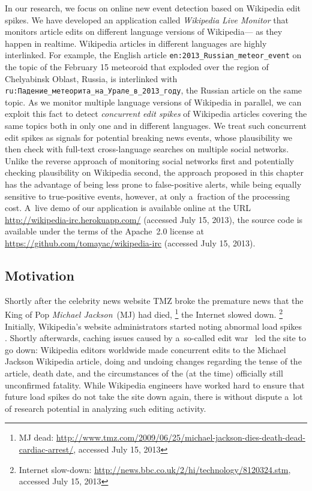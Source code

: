 In our research, we focus on online new event detection based on Wikipedia edit spikes.
We have developed an application called \emph{Wikipedia Live Monitor}
that monitors article edits on different language versions of Wikipedia---%
as they happen in realtime.
Wikipedia articles in different languages are highly interlinked.
For example, the English article \texttt{en:2013\_Russian\_meteor\_event}
on the topic of the February 15 meteoroid
that exploded over the region of Chelyabinsk Oblast, Russia,
is interlinked with 
\texttt{ru:{\selectfont Падение\_метеорита\_на\_Урале\_в\_2013\_году}},
the Russian article on the same topic.
As we monitor multiple language versions of Wikipedia in parallel,
we can exploit this fact to detect \emph{concurrent edit spikes}
of Wikipedia articles covering the same topics
both in only one and in different languages.
We treat such concurrent edit spikes as signals
for potential breaking news events, whose plausibility we then check 
with full-text cross-language searches on multiple social networks.
Unlike the reverse approach of monitoring social networks first
and potentially checking plausibility on Wikipedia second,
the approach proposed in this chapter has the advantage of
being less prone to false-positive alerts, while being equally sensitive
to true-positive events, however, at only a~fraction of the processing cost.
A~live demo of our application is available online
at the URL \url{http://wikipedia-irc.herokuapp.com/} (accessed July 15, 2013),
the source code is available
under the terms of the Apache~2.0 license at 
\url{https://github.com/tomayac/wikipedia-irc} (accessed July 15, 2013).

\subsection{Motivation}

Shortly after the celebrity news website TMZ
broke the premature news that the King of Pop \emph{Michael Jackson}~(MJ) had died,%
\footnote{MJ dead: \url{http://www.tmz.com/2009/06/25/michael-jackson-dies-death-dead-cardiac-arrest/},
accessed July 15, 2013}
the Internet slowed down.%
\footnote{Internet slow-down: \url{http://news.bbc.co.uk/2/hi/technology/8120324.stm},
accessed July 15, 2013}
Initially, Wikipedia's website administrators started noting abnormal load spikes~%
\cite{vibber2009currentevents}. Shortly afterwards, caching issues
caused by a~so-called edit war~\cite{beaumont2009editwar} led the site to go down:
Wikipedia editors worldwide made concurrent edits
to the Michael Jackson Wikipedia article, doing and undoing changes
regarding the tense of the article, death date,
and the circumstances of the (at the time) officially still unconfirmed fatality.
While Wikipedia engineers have worked hard
to ensure that future load spikes
do not take the site down again, there is without dispute a~lot of research potential
in analyzing such editing activity.


